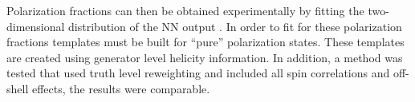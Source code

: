 Polarization fractions can then be obtained experimentally by fitting the two-dimensional distribution of the NN output \ctsNN.  
In order to fit for these polarization fractions templates must be built for ``pure'' polarization states. These
templates are created using generator level helicity information. In addition, a method was tested that used truth level reweighting and included all spin correlations and off-shell effects, the results were comparable.
